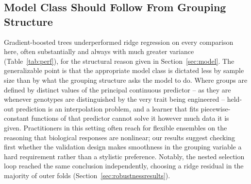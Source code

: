 \documentclass[runningheads]{llncs}
\begin{document}
\subsection{Model Class Should Follow From Grouping Structure}
Gradient-boosted trees underperformed ridge regression on every comparison here, often substantially and always with much greater variance (Table~\ref{tab:perf}), for the structural reason given in Section~\ref{sec:model}. The generalizable point is that the appropriate model class is dictated less by sample size than by what the grouping structure asks the model to do. Where groups are defined by distinct values of the principal continuous predictor -- as they are whenever genotypes are distinguished by the very trait being engineered -- held-out prediction is an interpolation problem, and a learner that fits piecewise-constant functions of that predictor cannot solve it however much data it is given. Practitioners in this setting often reach for flexible ensembles on the reasoning that biological responses are nonlinear; our results suggest checking first whether the validation design makes smoothness in the grouping variable a hard requirement rather than a stylistic preference. Notably, the nested selection loop reached the same conclusion independently, choosing a ridge residual in the majority of outer folds (Section~\ref{sec:robustnessresults}).
\end{document}

